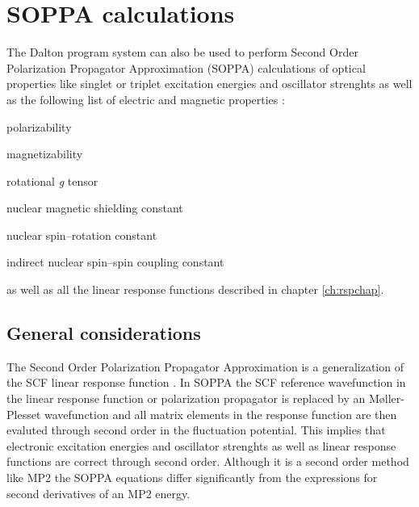 \chapter{SOPPA calculations}\label{ch:soppa}

The Dalton program system can also be used to perform Second Order
Polarization Propagator Approximation (SOPPA) 
calculations \cite{esnpjjodjcp73,mjpekdtehjajjojcp,spascpl260,tejospastcan100} 
of optical properties like singlet or triplet excitation
energies and oscillator strenghts as well as the following list of
electric and magnetic properties :
\begin{center}
\begin{list}{}{}
\item polarizability
\item magnetizability
\item rotational {\em g} tensor
\item nuclear magnetic shielding constant
\item nuclear spin--rotation constant
\item indirect nuclear spin--spin coupling constant
\end{list}
\end{center}
as well as all the linear response functions described in chapter
\ref{ch:rspchap}.


\section{General considerations}\label{sec:soppageneral}

The Second Order Polarization Propagator Approximation is a
generalization of the SCF linear response
function \cite{esnpjjodjcp73,jopjdycpr2,mjpekdtehjajjojcp}. In SOPPA the SCF 
reference wavefunction in the linear response function or polarization 
propagator is replaced by an M{\o}ller-Plesset wavefunction and all
matrix elements in the response function are then evaluted through
second order in the fluctuation potential. This implies that
electronic excitation energies and oscillator strenghts as well as
linear response functions are correct through second order. Although
it is a second order method like MP2 the SOPPA equations differ
significantly from the expressions for second derivatives of an MP2
energy. 


